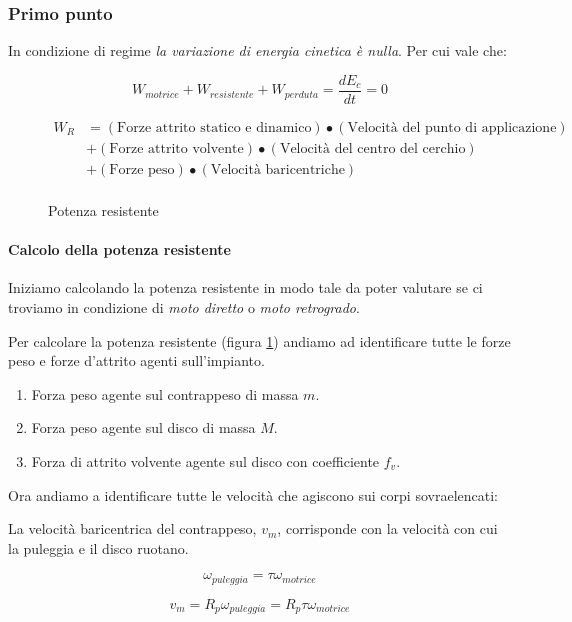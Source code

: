 \documentclass[main.tex]{subfiles}
\begin{document}
\subsubsection{Primo punto}
In condizione di regime \textit{la variazione di energia cinetica è nulla}. Per cui vale che:

\[
  W_{motrice} + W_{resistente} + W_{perduta} = \frac{dE_c}{dt} = 0
\]

\begin{figure}[H]
  \begin{align*}
    W_R &= (\text{Forze attrito statico e dinamico})\bullet(\text{Velocità del punto di applicazione}) \\
        &+ (\text{Forze attrito volvente})\bullet(\text{Velocità del centro del cerchio}) \\
        &+ (\text{Forze peso})\bullet(\text{Velocità baricentriche}) \\
  \end{align*}
  \caption{Potenza resistente}
  \label{potenza_resistente}
\end{figure}

\paragraph{Calcolo della potenza resistente}
Iniziamo calcolando la potenza resistente in modo tale da poter valutare se ci troviamo in condizione di \textit{moto diretto} o \textit{moto retrogrado}.

Per calcolare la potenza resistente (figura \ref{potenza_resistente}) andiamo ad identificare tutte le forze peso e forze d'attrito agenti sull'impianto.

\begin{enumerate}
  \item Forza peso agente sul contrappeso di massa $m$.
  \item Forza peso agente sul disco di massa $M$.
  \item Forza di attrito volvente agente sul disco con coefficiente $f_v$.
\end{enumerate}

Ora andiamo a identificare tutte le velocità che agiscono sui corpi sovraelencati:

La velocità baricentrica del contrappeso, $v_m$, corrisponde con la velocità con cui la puleggia e il disco ruotano.

\[
  \omega_{puleggia} = \tau\omega_{motrice}
\]

\[
  v_{m} = R_p\omega_{puleggia} = R_p\tau\omega_{motrice}
\]
\end{document}
